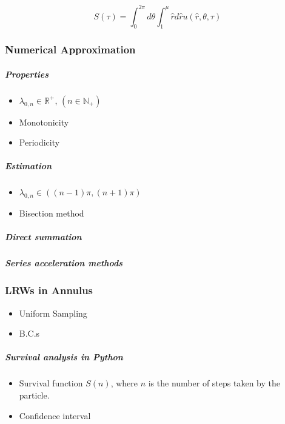        
      \begin{equation}\label{eq:heat_content_annulus}
        S(\tau) = \int_{0}^{2\pi} d\theta \int_{1}^{\mu} \hat r d \hat r u(\hat r, \theta, \tau)
      \end{equation}

   
  \subsubsection{Numerical Approximation}
      

      \subparagraph{Properties}
        \begin{itemize}
          \item $\lambda_{0, n} \in \mathbb{R^{+}}$, $(n \in \mathbb{N}_{+})$
          \item Monotonicity 
          \item Periodicity
        \end{itemize}
        
      \subparagraph{Estimation}
        \begin{itemize}
          \item $\lambda_{0, n} \in ((n-1) \pi, (n+1) \pi)$ \cite{NIST:DLMF}
          \item Bisection method \cite{2020SciPy-NMeth}
        \end{itemize}
        
        
      \subparagraph{Direct summation}
      \subparagraph{Series acceleration methods}

  \subsubsection{LRWs in Annulus}
      

      \begin{itemize}
        \item Uniform Sampling
        \item B.C.s
      \end{itemize}
      
      
    \subparagraph{Survival analysis in Python \cite{cameron_davidson_pilon_2020_4313838}}

       \begin{itemize}
         \item Survival function $S(n)$, where $n$ is the number of steps taken by the particle. 
         \item Confidence interval
       \end{itemize}
       

